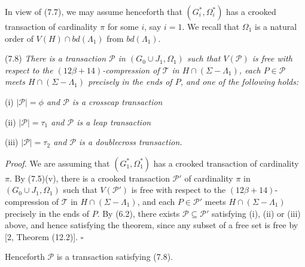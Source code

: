 In view of (7.7), we may assume henceforth that $(G_i^*, \Omega_i^*)$ has a crooked transaction of cardinality $\pi$ for some $i$, say $i = 1$. We recall that $\Omega_1$ is a natural order of $V(H) \cap bd(\Lambda_1)$ from $bd(\Lambda_1)$.

\stmt
(7.8) \textit{There is a transaction $\mathscr{P}$ in $(G_0 \cup J_1, \Omega_1)$ such that $V(\mathscr{P})$ is free with respect to the $(12\beta + 14)$-compression of $\mathscr{T}$ in $H \cap (\Sigma - \Lambda_1)$, each $P \in \mathscr{P}$ meets $H \cap (\Sigma - \Lambda_1)$ precisely in the ends of $P$, and one of the following holds:}

\hspace*{12pt}(i) \textit{$|\mathscr{P}| = \phi$ and $\mathscr{P}$ is a crosscap transaction}

\hspace*{12pt}(ii) \textit{$|\mathscr{P}| = \tau_1$ and $\mathscr{P}$ is a leap transaction}

\hspace*{12pt}(iii) \textit{$|\mathscr{P}| = \tau_2$ and $\mathscr{P}$ is a doublecross transaction.}

\textit{Proof.} We are assuming that $(G_1^*, \Omega_1^*)$ has a crooked transaction of cardinality $\pi$. By (7.5)(v), there is a crooked transaction $\mathscr{P}'$ of cardinality $\pi$ in $(G_0 \cup J_1, \Omega_1)$ such that $V(\mathscr{P}')$ is free with respect to the $(12\beta + 14)$-compression of $\mathscr{T}$ in $H \cap (\Sigma - \Lambda_1)$, and each $P \in \mathscr{P}'$ meets $H \cap (\Sigma - \Lambda_1)$ precisely in the ends of $P$. By (6.2), there exists $\mathscr{P} \subseteq \mathscr{P}'$ satisfying (i), (ii) or (iii) above, and hence satisfying the theorem, since any subset of a free set is free by [2, Theorem (12.2)]. $\square$

Henceforth $\mathscr{P}$ is a transaction satisfying (7.8).
